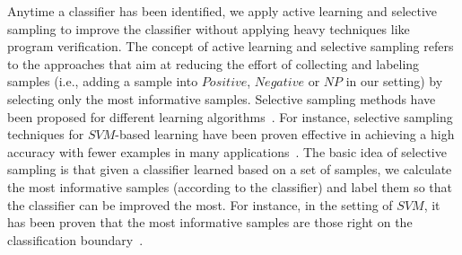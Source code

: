 Anytime a classifier has been identified, we apply active learning and selective sampling to improve the classifier without applying heavy techniques like program verification.
The concept of active learning and selective sampling refers to the approaches that aim at reducing the effort of collecting and labeling samples (i.e., adding a sample into $\mathit{Positive}$, $\mathit{Negative}$ or $\mathit{NP}$ in our setting) by selecting only the most informative samples. 
Selective sampling methods have been proposed for different learning algorithms~\cite{DBLP:conf/icml/OrabonaC11}.
For instance, selective sampling techniques for $\mathit{SVM}$-based learning have been proven effective in achieving a
high accuracy with fewer examples in many applications~\cite{DBLP:conf/icml/OrabonaC11,DBLP:conf/mm/TongC01,DBLP:journals/jmlr/TongK01}.
The basic idea of selective sampling is that given a classifier learned based on a set of samples, 
we calculate the most informative samples (according to the classifier) and label them so that the classifier can be improved the most.
For instance, in the setting of $\mathit{SVM}$, it has been proven that the most informative samples are those right on the classification boundary~\cite{DBLP:conf/icml/OrabonaC11}.
